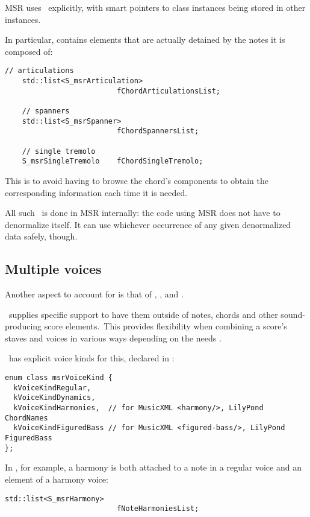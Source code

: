 MSR uses \denorm\ explicitly, with smart pointers to class instances being stored in other instances.

In particular,  contains elements that are actually detained by the notes it is composed of:
\begin{lstlisting}[language=CPlusPlus]
    // articulations
    std::list<S_msrArticulation>
                          fChordArticulationsList;

    // spanners
    std::list<S_msrSpanner>
                          fChordSpannersList;

    // single tremolo
    S_msrSingleTremolo    fChordSingleTremolo;
\end{lstlisting}

This is to avoid having to browse the chord's components to obtain the corresponding information each time it is needed.

All such \denorm\ is done in MSR internally: the code using MSR does not have to denormalize itself.
It can use whichever occurrence of any given denormalized data safely, though.


\subsection{Multiple voices}

Another aspect to account for is that of , ,  and .

\lily\ supplies specific support to have them outside of notes, chords and other sound-producing score elements.\
This provides flexibility when combining a score's staves and voices in various ways depending on the needs .

\mf\ has explicit voice kinds for this, declared in :
\begin{lstlisting}[language=CPlusPlus]
enum class msrVoiceKind {
  kVoiceKindRegular,
  kVoiceKindDynamics,
  kVoiceKindHarmonies,  // for MusicXML <harmony/>, LilyPond ChordNames
  kVoiceKindFiguredBass // for MusicXML <figured-bass/>, LilyPond FiguredBass
};
\end{lstlisting}

In \msrRepr, for example, a harmony is both attached to a note in a regular voice and an element of a harmony voice:
\begin{lstlisting}[language=CPlusPlus]
    std::list<S_msrHarmony>
                          fNoteHarmoniesList;
\end{lstlisting}

